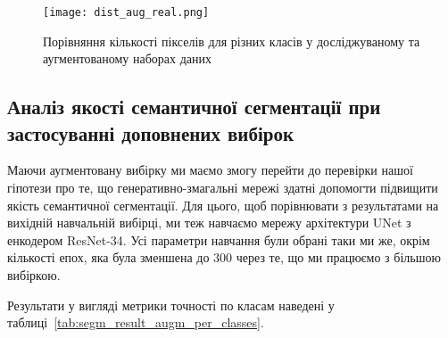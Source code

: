 \begin{figure}[ht!]
    \centering
    \texttt{[image: dist\_aug\_real.png]}
    \caption{Порівняння кількості пікселів для різних класів
        у досліджуваному та аугментованому наборах даних}
    \label{fig:pixels_per_class_aug}
\end{figure}

\subsection{Аналіз якості семантичної сегментації при застосуванні
    доповнених вибірок}

Маючи аугментовану вибірку ми маємо змогу перейти до перевірки
нашої гіпотези про те, що генеративно-змагальні мережі
здатні допомогти підвищити якість семантичної сегментації. Для цього,
щоб порівнювати з результатами на вихідній навчальній вибірці,
ми теж навчаємо мережу архітектури UNet з енкодером ResNet-34.
Усі параметри навчання були обрані таки ми же, окрім кількості
епох, яка була зменшена до $300$ через те, що ми працюємо з
більшою вибіркою.

Результати у вигляді метрики точності по класам наведені у
таблиці~\ref{tab:segm_result_augm_per_classes}.


